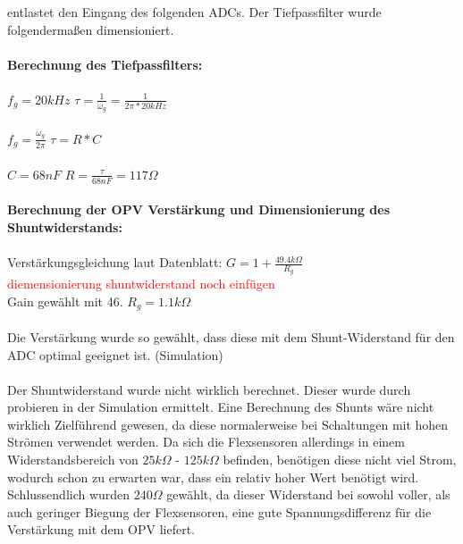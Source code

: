 \documentclass[11pt]{article}
\begin{document}
entlastet den Eingang des folgenden ADCs. Der Tiefpassfilter wurde folgendermaßen dimensioniert. \\
\\
\textbf{Berechnung des Tiefpassfilters:} \\
\\
\hspace*{1cm} $f_{g} = 20 kHz $ \hspace*{1cm} $\tau = \frac{1}{\omega_{g}} = \frac{1}{2\pi * 20 kHz} $ \\
\\
\hspace*{1cm} $f_{g} = \frac{\omega_{g}}{2\pi} $ \hspace*{1.7cm} $\tau = R * C $ \\
\\
\hspace*{4.25cm} $ C = 68 nF $ \hspace*{1cm} $ R = \frac{\tau}{68nF} = 117 \Omega $ \\
\\
\textbf{Berechnung der OPV Verstärkung und Dimensionierung des Shuntwiderstands:} \\
\\
\hspace*{1cm} Verstärkungsgleichung laut Datenblatt: $ G = 1+\frac{49.4k\Omega}{R_{g}} $ \\
\textcolor{red}{diemensionierung shuntwiderstand noch einfügen}
\\
\hspace*{1cm} Gain gewählt mit 46. \hspace*{1cm} $ R_{g} = 1.1k\Omega $ \\
\\
Die Verstärkung wurde so gewählt, dass diese mit dem Shunt-Widerstand für den ADC optimal geeignet ist. (Simulation) \\
\\
Der Shuntwiderstand wurde nicht wirklich berechnet. Dieser wurde durch probieren in der Simulation ermittelt. Eine Berechnung
des Shunts wäre nicht wirklich Zielführend gewesen, da diese normalerweise bei Schaltungen mit hohen Strömen verwendet werden. 
Da sich die Flexsensoren allerdings in einem Widerstandsbereich von $25k\Omega$ - $125k\Omega$ befinden, benötigen diese nicht
viel Strom, wodurch schon zu erwarten war, dass ein relativ hoher Wert benötigt wird. Schlussendlich wurden $240\Omega$ gewählt,
da dieser Widerstand bei sowohl voller, als auch geringer Biegung der Flexsensoren, eine gute Spannungsdifferenz für die 
Verstärkung mit dem OPV liefert. \\
\end{document}
